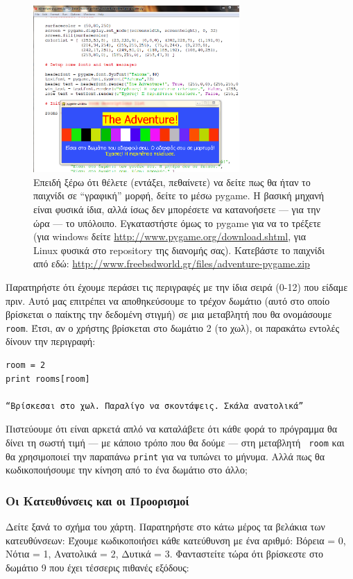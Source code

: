 \begin{figure}
  \centering
  \includegraphics[width=0.7\textwidth]{images/chapter2/py-adventure-pygame-run}
  \caption[Εκτέλεση του Adventure σε pygame]{Επειδή ξέρω ότι θέλετε (εντάξει, πεθαίνετε) να δείτε πως θα ήταν
το παιχνίδι σε ``γραφική'' μορφή, δείτε το μέσω pygame. Η βασική μηχανή είναι
φυσικά ίδια, αλλά ίσως δεν μπορέσετε να κατανοήσετε --- για την ώρα --- το
υπόλοιπο.  Εγκαταστήστε όμως το pygame για να το τρέξετε (για windows δείτε
\url{http://www.pygame.org/download.shtml}, για Linux φυσικά στο repository
της διανομής σας). Κατεβάστε το παιχνίδι από εδώ: \url{http://www.freebsdworld.gr/files/adventure-pygame.zip}}
  \label{2-5}
\end{figure}

Παρατηρήστε ότι έχουμε περάσει τις περιγραφές με την ίδια σειρά (0-12) που
είδαμε πριν. Αυτό μας επιτρέπει να αποθηκεύσουμε το τρέχον δωμάτιο (αυτό στο
οποίο βρίσκεται ο παίκτης την δεδομένη στιγμή) σε μια μεταβλητή που θα
ονομάσουμε {\tt room}. Έτσι, αν ο χρήστης βρίσκεται στο δωμάτιο 2 (το χωλ), οι
παρακάτω εντολές δίνουν την περιγραφή:
%
\begin{verbatim}
room = 2
print rooms[room]

“Βρίσκεσαι στο χωλ. Παραλίγο να σκοντάψεις. Σκάλα ανατολικά”
\end{verbatim}
%
Πιστεύουμε ότι είναι αρκετά απλό να καταλάβετε ότι κάθε φορά το πρόγραμμα θα
δίνει τη σωστή τιμή --- με κάποιο τρόπο που θα δούμε --- στη μεταβλητή {\tt
room} και
θα χρησιμοποιεί την παραπάνω {\tt print} για να τυπώνει το μήνυμα. Αλλά πως θα
κωδικοποιήσουμε την κίνηση από το ένα δωμάτιο στο άλλο;
%
\subsubsection{Οι Κατευθύνσεις και οι Προορισμοί}
%
Δείτε ξανά το σχήμα του χάρτη. Παρατηρήστε στο κάτω μέρος τα βελάκια των
κατευθύνσεων: Έχουμε κωδικοποιήσει κάθε κατεύθυνση με ένα αριθμό: Βόρεια =
0, Νότια = 1, Ανατολικά = 2, Δυτικά = 3. Φανταστείτε τώρα ότι βρίσκεστε στο
δωμάτιο 9 που έχει τέσσερις πιθανές εξόδους:

